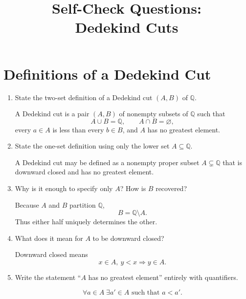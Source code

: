 \documentclass{self-check}
\title{Self-Check Questions:\\Dedekind Cuts}
\author{}
\date{}
\begin{document}
\maketitle
\tableofcontents
\newpage

\section{Definitions of a Dedekind Cut}

\begin{enumerate}[label=\arabic*., itemsep=10pt]

\item State the two-set definition of a Dedekind cut $(A,B)$ of $\mathbb{Q}$.

\begin{answer}
A Dedekind cut is a pair $(A,B)$ of nonempty subsets of $\mathbb{Q}$ such that
\[
A\cup B=\mathbb{Q},\qquad A\cap B=\varnothing,
\]
every $a\in A$ is less than every $b\in B$, and $A$ has no greatest element.
\end{answer}

\item State the one-set definition using only the lower set $A\subseteq\mathbb{Q}$.

\begin{answer}
A Dedekind cut may be defined as a nonempty proper subset $A\subsetneq\mathbb{Q}$ that is downward closed and has no greatest element.
\end{answer}

\item Why is it enough to specify only $A$? How is $B$ recovered?

\begin{answer}
Because $A$ and $B$ partition $\mathbb{Q}$,
\[
B=\mathbb{Q}\setminus A.
\]
Thus either half uniquely determines the other.
\end{answer}

\item What does it mean for $A$ to be downward closed?

\begin{answer}
Downward closed means
\[
x\in A,\ y<x \Longrightarrow y\in A.
\]
\end{answer}

\item Write the statement ``$A$ has no greatest element'' entirely with quantifiers.

\begin{answer}
\[
\forall a\in A\;\exists a'\in A\text{ such that }a<a'.
\]
\end{answer}


\end{enumerate}
\end{document}
